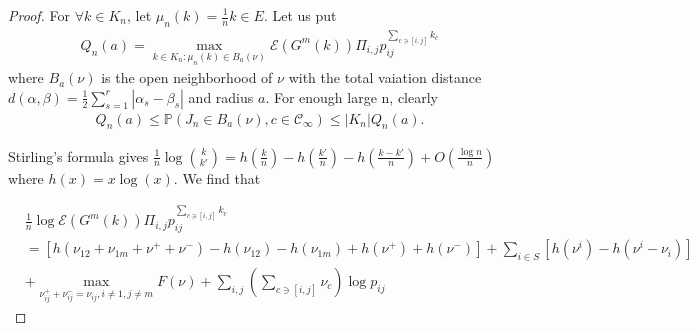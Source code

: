 \documentclass[11pt,en,cite=authoryear]{elegantpaper}
\begin{document}
\begin{proof}
    For $\forall k \in K_n$, let $\mu_n(k) = \frac{1}{n} k \in E$. Let us put
    \begin{align*}
        Q_n(a) = \max_{k\in K_n: \mu_n(k) \in B_a(\nu)} 
        \mathcal{E} (G^m(k)) \Pi_{i,j} p_{ij}^{\sum_{c \ni [i,j]} k_{c}}
    \end{align*}
    where $B_a(\nu)$ is the open neighborhood of $\nu$ with the total vaiation distance
    $ d(\alpha, \beta) = \frac{1}{2} \sum_{s=1}^r |\alpha_s - \beta_s| $ and radius $a$. 
    For enough large n, clearly
    \begin{align*}
        Q_n(a) 
        \le \mathbb{P}(J_{n} \in B_a(\nu), c \in \mathcal{C}_{\infty})
        \le |K_n| Q_n(a).
    \end{align*}

    Stirling's formula gives
    $\frac{1}{n} \log \binom{k}{k'} = h(\frac{k}{n} ) - h(\frac{k'}{n}) - h(\frac{k-k'}{n}) + O(\frac{\log n}{n})$
    where $h(x)=x\log(x)$. We find that

    \begin{align*}
        &\frac{1}{n} \log \mathcal{E} (G^m(k)) \Pi_{i, j} p_{ij}^{\sum_{c \ni [i,j]} k_{c}} \\
        &= [h(\nu_{12}+\nu_{1 m}+\nu^+ +\nu^-) - h(\nu_{12}) - h(\nu_{1m})+
        h(\nu^+) + h(\nu^-)]
        + \sum_{i \in S} [h(\nu^i) - h(\nu^i-\nu_i)]\\
        &+ \max_{\nu^+_{ij} + \nu^-_{ij} = \nu_{ij}, i\neq 1, j\neq m} F(\nu)
        + \sum_{i,j} (\sum_{c \ni [i,j]}\nu_c) \log p_{ij}
    \end{align*}
\end{proof}
\end{document}
